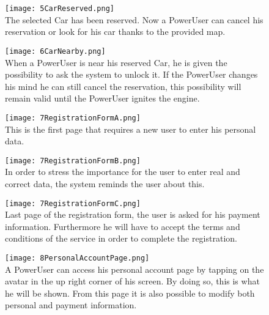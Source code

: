 \begin{figure}[p!]
    \centering
    \texttt{[image: 5CarReserved.png]}
    \label{fig:5CarReserved}
    \\The selected Car has been reserved. Now a PowerUser can cancel his reservation or look for his car thanks to the provided map.
\end{figure}

\begin{figure}[p!]
    \centering
    \texttt{[image: 6CarNearby.png]}
    \label{fig:6CarNearby}
    \\When a PowerUser is near his reserved Car, he is given the possibility to ask the system to unlock it. If the PowerUser changes his mind he can still cancel the reservation, this possibility will remain valid until the PowerUser ignites the engine. 
\end{figure}

\begin{figure}[p!]
    \centering
    \texttt{[image: 7RegistrationFormA.png]}
    \label{fig:7RegistrationFormAForm}
    \\This is the first page that requires a new user to enter his personal data.
\end{figure}

\begin{figure}[p!]
    \centering
    \texttt{[image: 7RegistrationFormB.png]}
    \label{fig:7RegistrationFormB}
    \\In order to stress the importance for the user to enter real and correct data, the system reminds the user about this.
\end{figure}

\begin{figure}[p!]
    \centering
    \texttt{[image: 7RegistrationFormC.png]}
    \label{fig:7RegistrationFormCnForm}
    \\Last page of the registration form, the user is asked for his payment information. Furthermore he will have to accept the terms and conditions of the service in order to complete the registration.
\end{figure}

\begin{figure}[p!]
    \centering
    \texttt{[image: 8PersonalAccountPage.png]}
    \label{fig:8PersonalAccountPage}
    \\A PowerUser can access his personal account page by tapping on the avatar in the up right corner of his screen. By doing so, this is what he will be shown. From this page it is also possible to modify both personal and payment information.
\end{figure}

